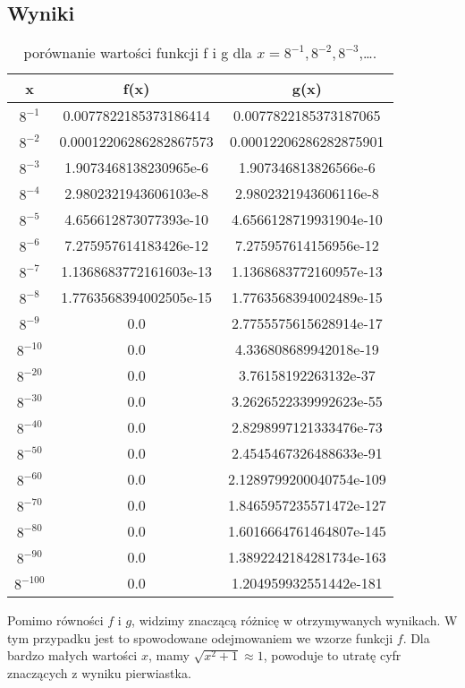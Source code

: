 \documentclass{article}
\begin{document}
\begin{center}
    \subsection{Wyniki}
    \begin{table}[h!]
        \centering
        \begin{tabular}{||c c c||} 
        \hline
        \textbf{x} & \textbf{f(x)} & \textbf{g(x)}  \\ [0.5ex]
        \hline\hline
         \(8^{-1}\) & 0.0077822185373186414 & 0.0077822185373187065 \\ 
         \(8^{-2}\) & 0.00012206286282867573  & 0.00012206286282875901 \\
         \(8^{-3}\) & 1.9073468138230965e-6 & 1.907346813826566e-6 \\ 
         \(8^{-4}\) & 2.9802321943606103e-8  & 2.9802321943606116e-8 \\ 
         \(8^{-5}\) & 4.656612873077393e-10  & 4.6566128719931904e-10 \\ 
         \(8^{-6}\) & 7.275957614183426e-12  & 7.275957614156956e-12 \\ 
         \(8^{-7}\) & 1.1368683772161603e-13 &  1.1368683772160957e-13 \\ 
         \(8^{-8}\) & 1.7763568394002505e-15 & 1.7763568394002489e-15 \\ 
         \(8^{-9}\) & 0.0 & 2.7755575615628914e-17 \\ 
         \(8^{-10}\) & 0.0 & 4.336808689942018e-19 \\ 
         \(8^{-20}\) & 0.0 & 3.76158192263132e-37 \\ 
         \(8^{-30}\) & 0.0 & 3.2626522339992623e-55 \\ 
         \(8^{-40}\) & 0.0 & 2.8298997121333476e-73 \\ 
         \(8^{-50}\) & 0.0 & 2.4545467326488633e-91 \\ 
         \(8^{-60}\) & 0.0 & 2.1289799200040754e-109 \\ 
         \(8^{-70}\) & 0.0 & 1.8465957235571472e-127 \\ 
         \(8^{-80}\) & 0.0 & 1.6016664761464807e-145 \\ 
         \(8^{-90}\) & 0.0 & 1.3892242184281734e-163 \\ 
         \(8^{-100}\) & 0.0 & 1.204959932551442e-181 \\ 
        \hline
        \end{tabular}
        \caption{porównanie wartości funkcji f i g dla \(x = 8^{-1},8^{-2},8^{-3}\),\ldots.}
        \label{table:5}
        \end{table}
        Pomimo równości \(f\) i \(g\), widzimy znaczącą różnicę w otrzymywanych wynikach.
        W tym przypadku jest to spowodowane odejmowaniem we wzorze funkcji \(f\).
        Dla bardzo małych wartości \(x\), mamy \(\textstyle \sqrt{x^2 + 1} \approx 1\), powoduje to utratę cyfr znaczących z wyniku pierwiastka.

\end{center}
\end{document}
